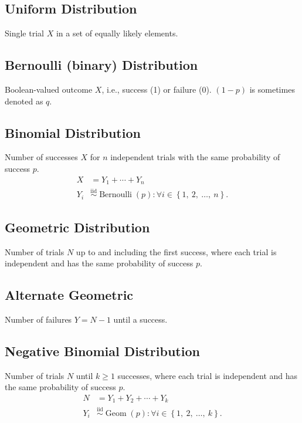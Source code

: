 \documentclass{article}
\begin{document}
\begin{minipage}{62.39259259mm}
    \subsection{Uniform Distribution}
    Single trial \(X\) in a set of equally likely elements.
    \subsection{Bernoulli (binary) Distribution}
    Boolean-valued outcome \(X\), i.e., success (1) or failure (0).
    \(\left( 1 - p \right)\) is sometimes denoted as \(q\).
    \subsection{Binomial Distribution}
    Number of successes \(X\) for \(n\) independent trials with the same probability of success \(p\).
    \begin{align*}
        X   & = Y_1 + \cdots + Y_n                                                                                                           \\
        Y_i & \overset{\mathrm{iid}}{\sim} \operatorname{Bernoulli}{\left( p \right)} : \forall i \in \left\{ 1,\: 2,\: \dots,\: n \right\}.
    \end{align*}
    \subsection{Geometric Distribution}
    Number of trials \(N\) up to and including the first success, where each trial is independent and has the same probability of success \(p\).
    \subsection{Alternate Geometric}
    Number of failures \(Y = N - 1\) until a success.
    \subsection{Negative Binomial Distribution}
    Number of trials \(N\) until \(k \geq 1\) successes, where each trial is independent and has the same probability of success \(p\).
    \begin{align*}
        N   & = Y_1 + Y_2 + \cdots + Y_k                                                                                                \\
        Y_i & \overset{\mathrm{iid}}{\sim} \operatorname{Geom}{\left( p \right)} : \forall i \in \left\{ 1,\: 2,\: \dots,\: k \right\}.
    \end{align*}

\end{minipage}
\end{document}

